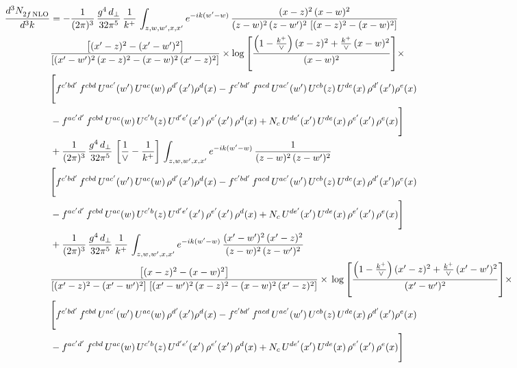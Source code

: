 \documentclass[9pt]{article}
\numberwithin{equation}{section}
\begin{document}
\begin{align}
    \frac{d^{3}N_{2f\,\rm NLO}^{\rm}}{d^{3}k}  & =   - \frac{1}{(2\pi)^{3}}\, \frac{g^{4}\,d_{\perp}}{32\pi^{5}}\,\frac{1}{k^{+}}\,\int_{z,w,w^{\prime},x,x'} e^{-ik(w^{\prime}-w)}\,\frac{(x-z)^{2}\, (x-w)^{2}}{(z-w)^{2}\, (z-w')^{2}\,\left[(x-z)^{2} - (x-w)^{2}\right]}\notag \\ & \frac{\left[(x'-z)^{2}-(x'-w')^{2}\right]}{\left[(x'-w')^{2}\, (x-z)^{2} - (x-w)^{2}\, (x'-z)^{2}\right]}\times \log{\left[\frac{\left(1-\frac{k^{+}}{\vee}\right)(x-z)^{2}+\frac{k^{+}}{\vee}\,(x-w)^{2}}{(x-w)^{2}}\right]}\times\notag \\ & \Bigg[f^{c'bd'}\,f^{cbd}\, U^{ac'}(w')\,U^{ac}(w)\,\rho^{d'}(x')\rho^{d}(x)- f^{c'bd'}\,f^{acd}\,U^{ac'}(w')\,U^{cb}(z)\,U^{de}(x)\,\rho^{d'}(x')\rho^{e}(x) \notag \\ & -f^{ac'd'}\,f^{cbd}\,U^{ac}(w)\,U^{c'b}(z)\,U^{d'e'}(x')\,\rho^{e'}(x')\,\rho^{d}(x) +N_{c}\,U^{de'}(x')\,U^{de}(x)\,\rho^{e'}(x')\,\rho^{e}(x)\Bigg]  \notag \\
& + \frac{1}{(2\pi)^{3}}\, \frac{g^{4}\,d_{\perp}}{32\pi^{5}}\,\left[\frac{1}{\vee} - \frac{1}{k^{+}}\right]\,\int_{z,w,w^{\prime},x,x'} e^{-ik(w^{\prime}-w)}\,\frac{1}{(z-w)^{2}\, (z-w')^{2}}\notag \\ & \Bigg[f^{c'bd'}\,f^{cbd}\, U^{ac'}(w')\,U^{ac}(w)\,\rho^{d'}(x')\rho^{d}(x)- f^{c'bd'}\,f^{acd}\,U^{ac'}(w')\,U^{cb}(z)\,U^{de}(x)\,\rho^{d'}(x')\rho^{e}(x) \notag \\ & -f^{ac'd'}\,f^{cbd}\,U^{ac}(w)\,U^{c'b}(z)\,U^{d'e'}(x')\,\rho^{e'}(x')\,\rho^{d}(x) +N_{c}\,U^{de'}(x')\,U^{de}(x)\,\rho^{e'}(x')\,\rho^{e}(x)\Bigg]  \notag \\
& + \frac{1}{(2\pi)^{3}}\, \frac{g^{4}\,d_{\perp}}{32\pi^{5}}\,\frac{1}{k^{+}}\,\int_{z,w,w^{\prime},x,x'} e^{-ik(w^{\prime}-w)}\,\frac{(x'-w')^{2}\, (x'-z)^{2}}{(z-w)^{2}\, (z-w')^{2}}\notag \\ & \frac{\left[(x-z)^{2} - (x-w)^{2}\right]}{\left[(x'-z)^{2} - (x'-w')^{2}\right]\, \left[(x'-w')^{2}\, (x - z)^{2} - (x-w)^{2}\,(x'-z)^{2}\right]}\times\, \log{\left[\frac{\left(1-\frac{k^{+}}{\vee}\right)(x'-z)^{2}+\frac{k^{+}}{\vee}\,(x'-w')^{2}}{(x'-w')^{2}}\right]}\times \notag \\ &  \Bigg[f^{c'bd'}\,f^{cbd}\, U^{ac'}(w')\,U^{ac}(w)\,\rho^{d'}(x')\rho^{d}(x)- f^{c'bd'}\,f^{acd}\,U^{ac'}(w')\,U^{cb}(z)\,U^{de}(x)\,\rho^{d'}(x')\rho^{e}(x) \notag \\ & -f^{ac'd'}\,f^{cbd}\,U^{ac}(w)\,U^{c'b}(z)\,U^{d'e'}(x')\,\rho^{e'}(x')\,\rho^{d}(x) +N_{c}\,U^{de'}(x')\,U^{de}(x)\,\rho^{e'}(x')\,\rho^{e}(x)\Bigg]
\end{align}
\end{document}
